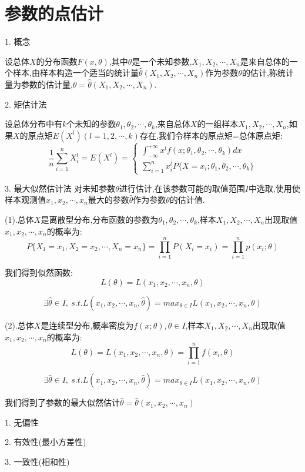 \section{参数的点估计}
\begin{definition}[矩估计和最大似然估计]
	1. 概念
	
	设总体$X$的分布函数$F(x,\theta)$,其中$\theta$是一个未知参数,$X_{1},X_{2},\cdots,X_{n}$是来自总体的一个样本,由样本构造一个适当的统计量$\hat{\theta}(X_{1},X_{2},\cdots,X_{n})$作为参数$\theta$的估计,称统计量为参数的估计量,$\theta=\hat{\theta}(X_{1},X_{2},\cdots,X_{n})$.
	
	2. 矩估计法
	
	设总体分布中有$k$个未知的参数$\theta_{1},\theta_{2},\cdots,\theta_{k}$,来自总体$X$的一组样本$X_{1},X_{2},\cdots,X_{n}$,如果$X$的原点矩$E(X^{l})(l=1,2,\cdots,k)$存在,我们令样本的原点矩=总体原点矩: 
	$$\dfrac{1}{n}\sum\limits_{i=1}^{n}X_{i}^{l}=E(X^{l})=\left\lbrace 
	\begin{array}{l}
		\int_{-\infty}^{+\infty}x^{l}f(x;\theta_{1},\theta_{2},\cdots,\theta_{k})dx\\
		\sum\limits_{i=1}^{n}x_{i}^{l}P\{X=x_{i};\theta_{1},\theta_{2},\cdots,\theta_{k}\}
	\end{array}
	\right. $$
	
	3. 最大似然估计法
	对未知参数$\theta$进行估计,在该参数可能的取值范围$I$中选取,使用使样本观测值$x_{1},x_{2},\cdots,x_{n}$最大的参数$\hat{\theta}$作为参数$\theta$的估计值.
	
	(1).总体$X$是离散型分布,分布函数的参数为$\theta_{1},\theta_{2},\cdots,\theta_{k}$,样本$X_{1},X_{2},\cdots,X_{n}$出现取值$x_{1},x_{2},\cdots,x_{n}$的概率为: 
	$$P\{X_{1}=x_{1},X_{2}=x_{2},\cdots,X_{n}=x_{n}\}=\prod\limits_{i=1}^{n}P(X_{i}=x_{i})=\prod\limits_{i=1}^{n}p(x_{i};\theta)$$
	
	我们得到似然函数: 
	$$L(\theta)=L(x_{1},x_{2},\cdots,x_{n},\theta)$$
	
	$$\exists \hat{\theta}\in I,\ s.t. L(x_{1},x_{2},\cdots,x_{n},\hat{\theta})=max_{\theta\in I}L(x_{1},x_{2},\cdots,x_{n},\theta)$$
	
	(2).总体$X$是连续型分布,概率密度为$f(x;\theta),\theta\in I$,样本$X_{1},X_{2},\cdots,X_{n}$出现取值$x_{1},x_{2},\cdots,x_{n}$的概率为: 
	$$L(\theta)=L(x_{1},x_{2},\cdots,x_{n},\theta)=\prod\limits_{i=1}^{n}f(x_{i},\theta)$$
	
	$$\exists \hat{\theta}\in I,\ s.t. L(x_{1},x_{2},\cdots,x_{n},\hat{\theta})=max_{\theta\in I}L(x_{1},x_{2},\cdots,x_{n},\theta)$$
	
	我们得到了参数的最大似然估计$\hat{\theta}=\hat{\theta}(x_{1},x_{2},\cdots,x_{n})$
	\begin{anymark}[估计量的评判标准]
		1. 无偏性
		
		2. 有效性(最小方差性)
		
		3. 一致性(相和性)
	\end{anymark}
\end{definition}
